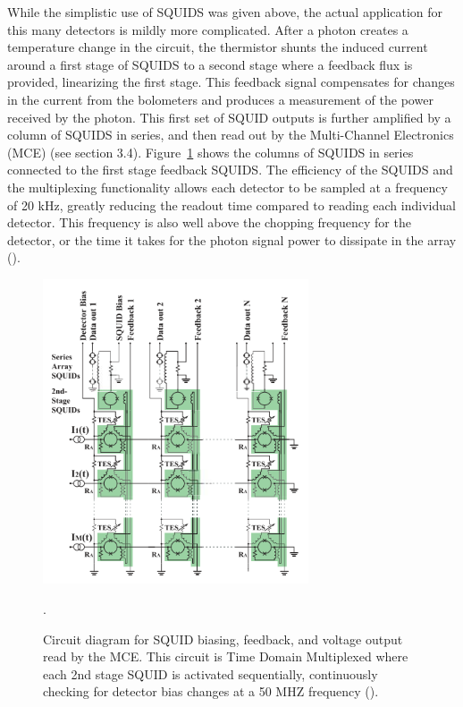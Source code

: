 \documentclass[manuscript]{aastex}
\begin{document}
While the simplistic use of SQUIDS was given above, the actual application for this many detectors is mildly more complicated. After a photon creates a temperature change in the circuit, the thermistor shunts the induced current around a first stage of SQUIDS to a second stage where a feedback flux is provided, linearizing the first stage. This feedback signal compensates for changes in the current from the bolometers and produces a measurement of the power received by the photon. This first set of SQUID outputs is further amplified by a column of SQUIDS in series, and then read out by the Multi-Channel Electronics (MCE) (see section 3.4). Figure~\ref{fig:squids} shows the columns of SQUIDS in series connected to the first stage feedback SQUIDS. The efficiency of the SQUIDS and the multiplexing functionality allows each detector to be sampled at a frequency of 20 kHz, greatly reducing the readout time compared to reading each individual detector. This frequency is also well above the chopping frequency for the detector, or the time it takes for the photon signal power to dissipate in the array (\cite{Dobbs2009}). 

\begin{figure}[H]
\centering
\captionsetup{width=0.7\textwidth}
\includegraphics[width=0.7\textwidth]{squids.PNG}
\caption[Circuit Diagram for TDM SQUIDS -(\cite{Dobbs2009})]{Circuit diagram for SQUID biasing, feedback, and voltage output read by the MCE. This circuit is Time Domain Multiplexed where each 2nd stage SQUID is activated sequentially, continuously checking for detector bias changes at a 50 MHZ frequency (\cite{Dobbs2009}).}. 
\label{fig:squids}
\vspace{-0.8cm}
\end{figure}
\end{document}
